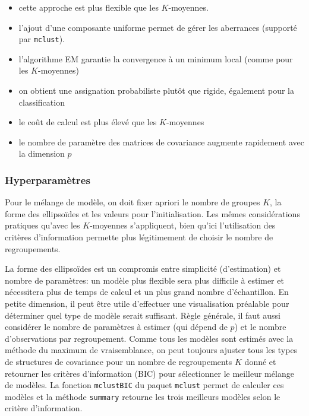 \documentclass[
  11pt,
  letterpaper,
]{scrbook}
\providecommand{\tightlist}{%
  \setlength{\itemsep}{0pt}\setlength{\parskip}{0pt}}\usepackage{longtable,booktabs,array}
\theoremstyle{definition}
\theoremstyle{remark}
\begin{document}
\begin{itemize}
\tightlist
\item
  cette approche est plus flexible que les \(K\)-moyennes.
\item
  l'ajout d'une composante uniforme permet de gérer les aberrances
  (supporté par \texttt{mclust}).
\item
  l'algorithme EM garantie la convergence à un minimum local (comme pour
  les \(K\)-moyennes)
\item
  on obtient une assignation probabiliste plutôt que rigide, également
  pour la classification
\item
  le coût de calcul est plus élevé que les \(K\)-moyennes
\item
  le nombre de paramètre des matrices de covariance augmente rapidement
  avec la dimension \(p\)
\end{itemize}

\hypertarget{hyperparamuxe8tres}{%
\subsubsection{Hyperparamètres}\label{hyperparamuxe8tres}}

Pour le mélange de modèle, on doit fixer apriori le nombre de groupes
\(K\), la forme des ellipsoïdes et les valeurs pour l'initialisation.
Les mêmes considérations pratiques qu'avec les \(K\)-moyennes
s'appliquent, bien qu'ici l'utilisation des critères d'information
permette plus légitimement de choisir le nombre de regroupements.

La forme des ellipsoïdes est un compromis entre simplicité
(d'estimation) et nombre de paramètres: un modèle plus flexible sera
plus difficile à estimer et nécessitera plus de temps de calcul et un
plus grand nombre d'échantillon. En petite dimension, il peut être utile
d'effectuer une visualisation préalable pour déterminer quel type de
modèle serait suffisant. Règle générale, il faut aussi considérer le
nombre de paramètres à estimer (qui dépend de \(p\)) et le nombre
d'observations par regroupement. Comme tous les modèles sont estimés
avec la méthode du maximum de vraisemblance, on peut toujours ajuster
tous les types de structures de covariance pour un nombre de
regroupements \(K\) donné et retourner les critères d'information (BIC)
pour sélectionner le meilleur mélange de modèles. La fonction
\texttt{mclustBIC} du paquet \texttt{mclust} permet de calculer ces
modèles et la méthode \texttt{summary} retourne les trois meilleurs
modèles selon le critère d'information.
\end{document}
